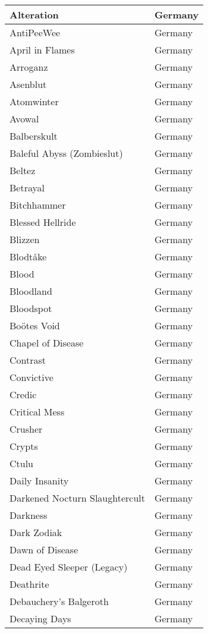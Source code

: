 \documentclass[12pt, a4paper, twoside]{report}
\begin{document}
\begin{center}
\begin{longtable}{|p{5cm}|p{5cm}|}
Alteration & Germany \\ \hline
AntiPeeWee & Germany \\ \hline
April in Flames & Germany \\ \hline
Arroganz & Germany \\ \hline
Asenblut & Germany \\ \hline
Atomwinter & Germany \\ \hline
Avowal & Germany \\ \hline
Balberskult & Germany \\ \hline
Baleful Abyss (Zombieslut) & Germany \\ \hline
Beltez & Germany \\ \hline
Betrayal & Germany \\ \hline
Bitchhammer & Germany \\ \hline
Blessed Hellride & Germany \\ \hline
Blizzen & Germany \\ \hline
Blodtåke & Germany \\ \hline
Blood & Germany \\ \hline
Bloodland & Germany \\ \hline
Bloodspot & Germany \\ \hline
Boötes Void & Germany \\ \hline
Chapel of Disease & Germany \\ \hline
Contrast & Germany \\ \hline
Convictive & Germany \\ \hline
Credic & Germany \\ \hline
Critical Mess & Germany \\ \hline
Crusher & Germany \\ \hline
Crypts & Germany \\ \hline
Ctulu & Germany \\ \hline
Daily Insanity & Germany \\ \hline
Darkened Nocturn Slaughtercult & Germany \\ \hline
Darkness & Germany \\ \hline
Dark Zodiak & Germany \\ \hline
Dawn of Disease & Germany \\ \hline
Dead Eyed Sleeper (Legacy) & Germany \\ \hline
Deathrite & Germany \\ \hline
Debauchery's Balgeroth & Germany \\ \hline
Decaying Days & Germany \\ \hline

\end{longtable}
\end{center}
\end{document}
